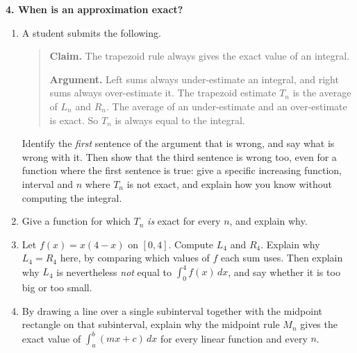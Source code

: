 \documentclass[11pt]{article}
\newcommand{\prob}[1]{\medskip\noindent\textbf{\large #1}\par\smallskip}
\begin{document}
\newpage
\prob{4. When is an approximation exact?}
\begin{enumerate}
\item A student submits the following.
\smallskip
\begin{quote}
\textbf{Claim.} The trapezoid rule always gives the exact value of an integral.

\textbf{Argument.} Left sums always under-estimate an integral, and right sums always over-estimate it. The trapezoid estimate $T_n$ is the average of $L_n$ and $R_n$. The average of an under-estimate and an over-estimate is exact. So $T_n$ is always equal to the integral.
\end{quote}
\smallskip
Identify the \emph{first} sentence of the argument that is wrong, and say what is wrong with it. Then show that the third sentence is wrong too, even for a function where the first sentence is true: give a specific increasing function, interval and $n$ where $T_n$ is not exact, and explain how you know without computing the integral.

\item Give a function for which $T_n$ \emph{is} exact for every $n$, and explain why.

\item Let $f(x)=x(4-x)$ on $[0,4]$. Compute $L_4$ and $R_4$. Explain why $L_4=R_4$ here, by comparing which values of $f$ each sum uses. Then explain why $L_4$ is nevertheless \emph{not} equal to $\int_0^4f(x)\,dx$, and say whether it is too big or too small.

\item By drawing a line over a single subinterval together with the midpoint rectangle on that subinterval, explain why the midpoint rule $M_n$ gives the exact value of $\int_a^b(mx+c)\,dx$ for every linear function and every $n$.

\end{enumerate}
\end{document}
